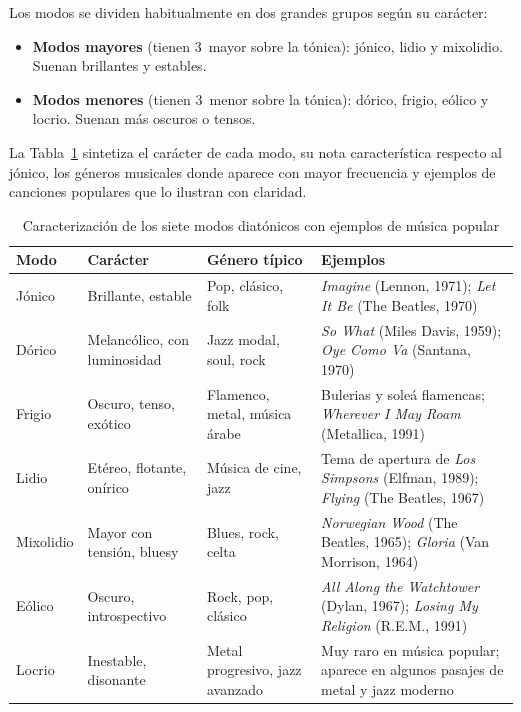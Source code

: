 \documentclass[%
    school=etsisi,%
    type=pfg,%
    degree=61CD,%
]{upm-report}
\begin{document}
Los modos se dividen habitualmente en dos grandes grupos seg\'un su car\'acter:

\begin{itemize}
    \item \textbf{Modos mayores} (tienen 3\textordfeminine\ mayor sobre la t\'onica): j\'onico, lidio y mixolidio. Suenan brillantes y estables.
    \item \textbf{Modos menores} (tienen 3\textordfeminine\ menor sobre la t\'onica): d\'orico, frigio, e\'olico y locrio. Suenan m\'as oscuros o tensos.
\end{itemize}

La Tabla~\ref{tab:modos-ejemplos} sintetiza el car\'acter de cada modo, su nota caracter\'istica respecto al jónico, los géneros musicales donde aparece con mayor frecuencia y ejemplos de canciones populares que lo ilustran con claridad.

\begin{table}[H]
    \centering
    \caption{Caracterización de los siete modos diatónicos con ejemplos de música popular}
    \label{tab:modos-ejemplos}
    \small
    \begin{tabular}{llp{2.6cm}p{5.2cm}}
        \toprule
        \textbf{Modo} & \textbf{Car\'acter} & \textbf{G\'enero t\'ipico} & \textbf{Ejemplos} \\
        \midrule
        J\'onico
            & Brillante, estable
            & Pop, cl\'asico, folk
            & \textit{Imagine} (Lennon, 1971); \textit{Let It Be} (The Beatles, 1970) \\
        \addlinespace
        D\'orico
            & Melanc\'olico, con luminosidad
            & Jazz modal, soul, rock
            & \textit{So What} (Miles Davis, 1959); \textit{Oye Como Va} (Santana, 1970) \\
        \addlinespace
        Frigio
            & Oscuro, tenso, exótico
            & Flamenco, metal, m\'usica \'arabe
            & Bulerias y soleá flamencas; \textit{Wherever I May Roam} (Metallica, 1991) \\
        \addlinespace
        Lidio
            & Et\'ereo, flotante, onírico
            & M\'usica de cine, jazz
            & Tema de apertura de \textit{Los Simpsons} (Elfman, 1989); \textit{Flying} (The Beatles, 1967) \\
        \addlinespace
        Mixolidio
            & Mayor con tensión, bluesy
            & Blues, rock, celta
            & \textit{Norwegian Wood} (The Beatles, 1965); \textit{Gloria} (Van Morrison, 1964) \\
        \addlinespace
        E\'olico
            & Oscuro, introspectivo
            & Rock, pop, cl\'asico
            & \textit{All Along the Watchtower} (Dylan, 1967); \textit{Losing My Religion} (R.E.M., 1991) \\
        \addlinespace
        Locrio
            & Inestable, disonante
            & Metal progresivo, jazz avanzado
            & Muy raro en m\'usica popular; aparece en algunos pasajes de metal y jazz moderno \\
        \bottomrule
    \end{tabular}
\end{table}
\end{document}

